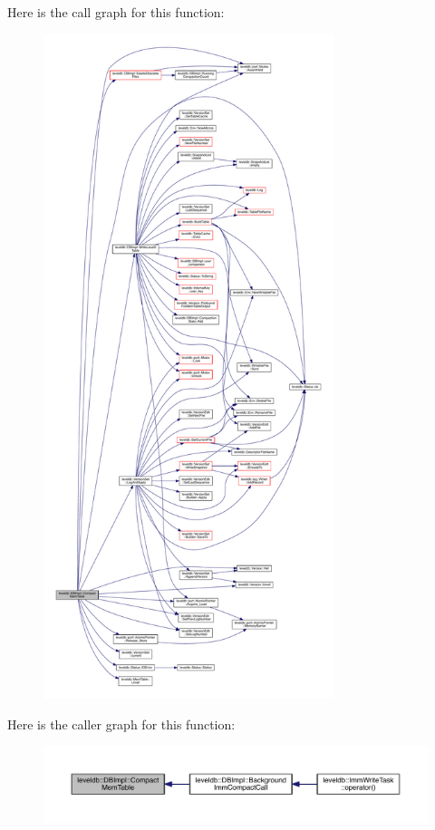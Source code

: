 Here is the call graph for this function\+:\nopagebreak
\begin{figure}[H]
\begin{center}
\leavevmode
\includegraphics[height=550pt]{classleveldb_1_1_d_b_impl_a251b1fb7890cf9ebc377ebfca4462f5a_cgraph}
\end{center}
\end{figure}




Here is the caller graph for this function\+:\nopagebreak
\begin{figure}[H]
\begin{center}
\leavevmode
\includegraphics[width=350pt]{classleveldb_1_1_d_b_impl_a251b1fb7890cf9ebc377ebfca4462f5a_icgraph}
\end{center}
\end{figure}


